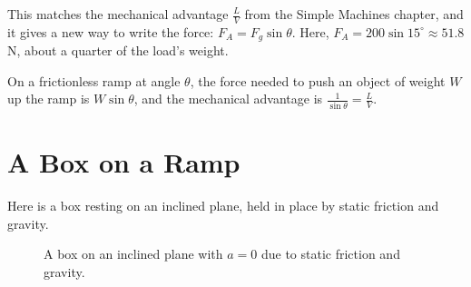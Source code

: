 This matches the mechanical advantage $\frac{L}{V}$ from the Simple Machines chapter,
and it gives a new way to write the force: $F_A = F_g\sin\theta$. Here,
$F_A = 200\sin 15^\circ \approx 51.8$ N, about a quarter of the load's weight.

\begin{mdframed}[style = important, frametitle={Ramps and Angles}]
On a frictionless ramp at angle $\theta$, the force needed to push an object of
weight $W$ up the ramp is $W\sin\theta$, and the mechanical advantage is
$\frac{1}{\sin\theta} = \frac{L}{V}$.
\end{mdframed}

\section{A Box on a Ramp}
Here is a box resting on an inclined plane, held in place by static friction and gravity.

\begin{figure}[H] \centering
{}
\caption{A box on an inclined plane with $a=0$ due to static friction and gravity.}
\label{fig:incline-box} 
\end{figure} 


